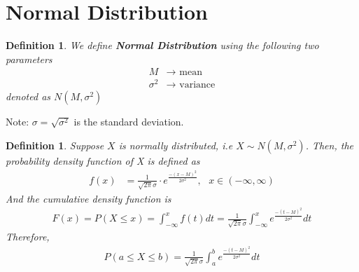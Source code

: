 \documentclass[11pt,oneside]{book}
\theoremstyle{newStyle}
\newtheorem{defn}[thm]{Definition}
\newcommand{\note}{\color{red}Note: \color{black}}
\begin{document}
\section[Normal Distribution]{Normal Distribution}
\begin{defn}
We define \textbf{Normal Distribution} using the following two parameters \begin{align*}
M &\to \text{ mean}\\
\sigma^2 &\to \text{ variance} 
\end{align*}
denoted as $N(M,\sigma^2)$
\end{defn}
\note $\sigma = \sqrt{\sigma^2}$ is the standard deviation.\begin{defn}
Suppose $X$ is normally distributed, i.e $X\sim N(M,\sigma^2)$. Then, the probability density function of X is defined as \begin{align*}
f(x)&=\frac{1}{\sqrt{2\pi}\sigma}\cdot e^{\frac{-(x-M)^2}{2\sigma^2}}, \text{ }x\in (-\infty, \infty)
\end{align*}
And the cumulative density function is \begin{align*}
F(x)=P(X\leq x)=\int_{-\infty}^{x}f(t)dt=\frac{1}{\sqrt{2\pi}\sigma}\int_{-\infty}^{x} e^{\frac{-(t-M)^2}{2\sigma^2}}dt
\end{align*}
Therefore, \begin{align*}
P(a\leq X \leq b)=\frac{1}{\sqrt{2\pi}\sigma}\int_{a}^{b} e^{\frac{-(t-M)^2}{2\sigma^2}}dt
\end{align*}
\end{defn}
\end{document}
